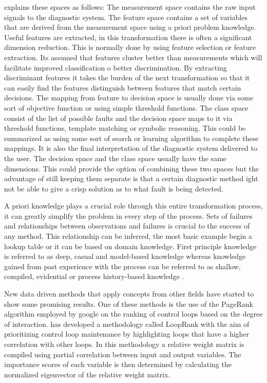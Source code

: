 \cite{venkatasubramanian2003review} explains these spaces as follows:
The measurement space contains the raw input signals to the diagnostic system. The feature space contains a set of variables that are derived from the measurement space using a priori problem knowledge. Useful features are extracted, in this transformation there is often a significant dimension reduction. This is normally done by using feature selection or feature extraction. Its assumed that features cluster better than measurements which will facilitate improved classification o better discrimination. By extracting discriminant features it takes the burden of the next transformation so that it can easily find the features distinguish between features that match certain decisions.
The mapping from feature to decision space is usually done via some sort of objective function or using simple threshold functions. The class space consist of the list of possible faults and the decision space maps to it via threshold functions, template matching or symbolic reasoning. This could be summarized as using some sort of search or learning algorithm to complete these mappings. It is also the final interpretation of the diagnostic system delivered to the user. The decision space and the class space usually have the same dimensions. This could provide the option of combining these two spaces but the advantage of still keeping them separate is that a certain diagnostic method ight not be able to give a crisp solution as to what fault is being detected.

A priori knowledge plays a crucial role through this entire transformation process, it can greatly simplify the problem in every step of the process. Sets of failures and relationships between observations and failures is crucial to the success of any method. This relationship can be inferred, the most basic example begin a lookup table or it can be based on domain knowledge. First principle knowledge is referred to as deep, casual and model-based knowledge whereas knowledge gained from past experience with the process can be referred to as shallow, compiled, evidential or process history-based knowledge \cite{venkatasubramanian2003review}.

New data driven methods that apply concepts from other fields have started to show some promising results. One of these methods is the use of the PageRank algorithm \cite{bryan200625} employed by google on the ranking of control loops based on the degree of interaction.\cite{farenzena2009looprank} has developed a methodology called LoopRank with the aim of prioritizing control loop maintenance by highlighting loops that have a higher correlation with other loops. In this methodology a relative weight matrix is compiled using partial correlation between input and output variables. The importance scores of each variable is then determined by calculating the normalized eigenvector of the relative weight matrix.\\

